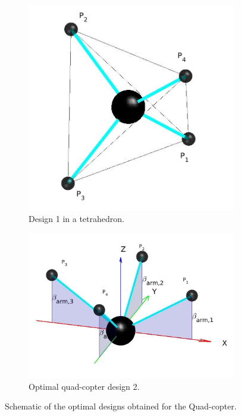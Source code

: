 \begin{figure}[!h]
{\begin{subfigure}[b]{0.35\textwidth}
    \includegraphics[width=\linewidth]{images/Quad_tetrahedron.jpg}
    \caption{Design 1 in a tetrahedron.} \label{fig:Quadcopter_resultb}
  \end{subfigure}
  \hspace*{\fill} %
  \begin{subfigure}[b]{0.45\textwidth}
    \includegraphics[width=\linewidth]{images/Quadcopter2.jpg}
    \caption{Optimal quad-copter design 2.} \label{fig:Quadcopter_resultc}
  \end{subfigure}}
  \caption{Schematic of the optimal designs obtained for the Quad-copter.}
  \label{fig:Quadcopter_result}
\end{figure}


